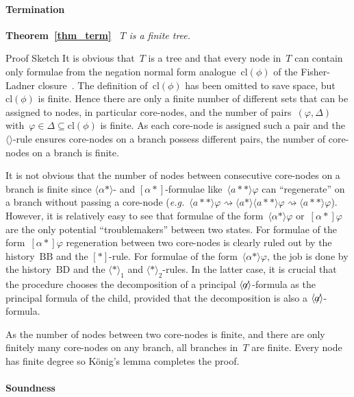 \documentclass{entcs}
\newcommand{\eg}{\emph{e.g.}}
\newcommand{\pea}[2]{\langle#1\rangle #2}
\newcommand{\paa}[2]{[#1] #2}
\newcommand{\prp}[1]{#1*}
\newcommand{\fean}{$\pea{\not\!\!a}{}$}
\newcommand{\pcl}[1]{\mathrm{cl}(#1)}
\newcommand{\pzz}{\mathrel{\rightsquigarrow}}
\newcommand{\tbdia}{\mathrm{BD}}
\newcommand{\tbbox}{\mathrm{BB}}
\newcommand{\trar}{$\paa{\prp{}}{}$}
\newcommand{\trero}{$\pea{\prp{}}{}_1$}
\newcommand{\trert}{$\pea{\prp{}}{}_2$}
\newcommand{\trea}{$\langle\rangle$}
\begin{document}
\paragraph{\bf Termination}

\noindent{}\textbf{Theorem~\ref{thm_term}\ }
\emph{$T$ is a finite tree.}
\begin{proof*}{Proof Sketch}
  It is obvious that~$T$ is a tree
  and that every node in~$T$ can contain only formulae
  from the negation normal form analogue~$\pcl{\phi}$
  of the Fisher-Ladner closure~\cite{fischer-ladner-dynamic}.
  The definition of~$\pcl{\phi}$ has been omitted to save space,
  but~$\pcl{\phi}$ is finite.
  Hence there are only a finite number of different sets
  that can be assigned to nodes,
  in particular core-nodes,
  and the number of pairs~$(\varphi, \Delta)$
  with~$\varphi \in \Delta \subseteq \pcl{\phi}$ is finite.
  As each core-node is assigned such a pair
  and the \trea{}-rule ensures
  core-nodes on a branch possess different pairs,
  the number of core-nodes on a branch is finite.

  It is not obvious
  that the number of nodes between consecutive core-nodes on a branch is finite
  since $\pea{\prp{\alpha}}{}$-
  and $\paa{\prp{\alpha}}{}$-formulae like~$\pea{\prp{\prp{a}}}{\varphi}$
  can ``regenerate'' on a branch without passing a core-node
  (\eg{}~$\pea{\prp{\prp{a}}}{\varphi} \pzz \pea{\prp{a}}\pea{\prp{\prp{a}}}{\varphi} \pzz
  \pea{\prp{\prp{a}}}{\varphi}$).
  However, it is relatively easy to see
  that formulae of the form~$\pea{\prp{\alpha}}{\varphi}$ or~$\paa{\prp{\alpha}}{\varphi}$
  are the only potential ``troublemakers'' between two states.
  For formulae of the form~$\paa{\prp{\alpha}}{\varphi}$
  regeneration between two core-nodes is clearly ruled out
  by the history~$\tbbox$ and the \trar{}-rule.
  For formulae of the form~$\pea{\prp{\alpha}}{\varphi}$,
  the job is done by the history~$\tbdia$ and the \trero{} and \trert{}-rules.
  In the latter case, it is crucial
  that the procedure chooses the decomposition of a principal \fean{}-formula
  as the principal formula of the child,
  provided that the decomposition is also a \fean{}-formula.

  As the number of nodes between two core-nodes is finite,
  and there are only finitely many core-nodes on any branch,
  all branches in~$T$ are finite.
  Every node has finite degree
  so K\"onig's lemma completes the proof.
\end{proof*}

\paragraph{\bf Soundness}
\end{document}
